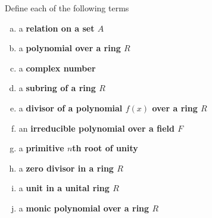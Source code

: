 \documentclass[11pt]{exam}
\begin{document}
\newpage %

%
%
%

\begin{questions}
\question[10] Define each of the following terms

\begin{enumerate}[(a)]
\item a \bf relation \md on a set $A$
\vfill

\item a \bf polynomial \md over a ring $R$
\vfill

\item a \bf complex number \md
\vfill

\item a \bf subring \md of a ring $R$
\vfill

\item a \bf divisor \md of a polynomial $f(x)$ over a ring $R$
\vfill
\newpage

\item an \bf irreducible \md polynomial over a field $F$
\vfill

\item a \bf primitive $n$th root of unity\md
\vfill

\item a \bf zero divisor \md in a ring $R$
\vfill

\item a \bf unit \md in a unital ring $R$
\vfill

\item a \bf monic \md polynomial over a ring $R$
\vfill

\end{enumerate}
\newpage



\end{questions}
\end{document}
